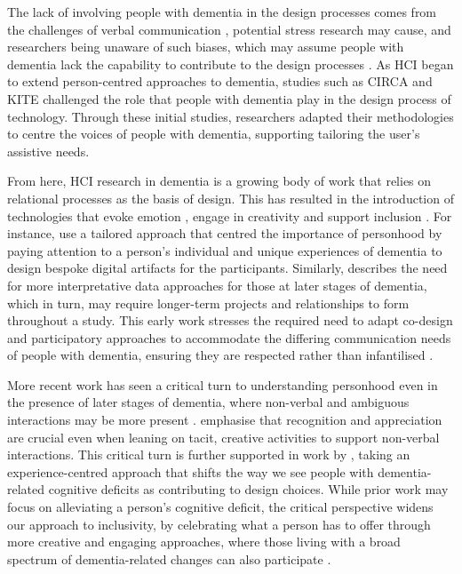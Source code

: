 The lack of involving people with dementia in the design processes comes from the challenges of verbal communication \citep{majlesi2017video}, potential stress research may cause, and researchers being unaware of such biases, which may assume people with dementia lack the capability to contribute to the design processes \citep{manthorpe_person-centered_2016}. As HCI began to extend person-centred approaches to dementia, studies such as CIRCA \citep{astell_stimulating_2010} and KITE \citep{robinson2009keeping} challenged the role that people with dementia play in the design process of technology. Through these initial studies, researchers adapted their methodologies to centre the voices of people with dementia, supporting tailoring the user's assistive needs. 

From here, HCI research in dementia is a growing body of work that relies on relational processes as the basis of design. This has resulted in the introduction of technologies that evoke emotion \citep{wallace_enabling_2012-1,houben_foregrounding_2019,dixon_approach_2020} , engage in creativity \citep{lindsay_empathy_2012,morrissey_im_2016} and support inclusion \citep{welsh_ticket_2018,foley_printer_2019,treadaway_sensor_2016}. For instance, \cite{wallace_design-led_2013} use a tailored approach that centred the importance of personhood by paying attention to a person’s individual and unique experiences of dementia to design bespoke digital artifacts for the participants. Similarly, \cite{lindsay_empathy_2012} describes the need for more interpretative data approaches for those at later stages of dementia, which in turn, may require longer-term projects and relationships to form throughout a study. This early work stresses the required need to adapt co-design and participatory approaches to accommodate the differing communication needs of people with dementia, ensuring they are respected rather than infantilised \citep{brankaert_intersections_2019}. 

More recent work has seen a critical turn to understanding personhood even in the presence of later stages of dementia, where non-verbal and ambiguous interactions may be more present \citep{lazar_critical_2017}. \cite{treadaway_sensor_2016} emphasise that recognition and appreciation are crucial even when leaning on tacit, creative activities to support non-verbal interactions. This critical turn is further supported in work by \cite{morrissey_value_2017}, taking an experience-centred approach that shifts the way we see people with dementia-related cognitive deficits as contributing to design choices. While prior work may focus on alleviating a person's cognitive deficit, the critical perspective widens our approach to inclusivity, by celebrating what a person has to offer through more creative and engaging approaches, where those living with a broad spectrum of dementia-related changes can also participate \citep{foley_printer_2019}.

